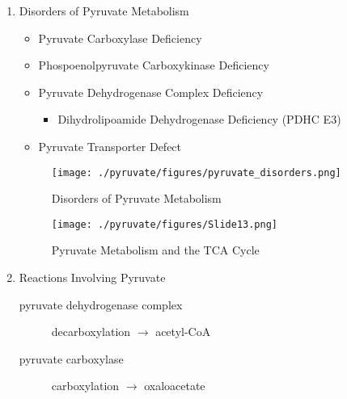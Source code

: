 \documentclass{scrartcl}
\begin{document}
\begin{center}
\setatomsep{1.8em}
\hspace{20}
\end{center}
\begin{enumerate}
\item Disorders of Pyruvate Metabolism
\label{sec:org49226a3}
\begin{itemize}
\item Pyruvate Carboxylase Deficiency
\item Phospoenolpyruvate Carboxykinase Deficiency
\item Pyruvate Dehydrogenase Complex Deficiency
\begin{itemize}
\item Dihydrolipoamide Dehydrogenase Deficiency (PDHC E3)
\end{itemize}
\item Pyruvate Transporter Defect
\end{itemize}

\begin{figure}[htbp]
\centering
\texttt{[image: ./pyruvate/figures/pyruvate\_disorders.png]}
\caption[TCA]{\label{fig:org500a801}
Disorders of Pyruvate Metabolism}
\end{figure}


\begin{figure}[htbp]
\centering
\texttt{[image: ./pyruvate/figures/Slide13.png]}
\caption[TCA]{\label{fig:org5dc46d8}
Pyruvate Metabolism and the TCA Cycle}
\end{figure}

\item Reactions Involving Pyruvate
\label{sec:org8d33627}

\begin{description}
\item[{pyruvate dehydrogenase complex}] decarboxylation \(\to\) acetyl-CoA
\end{description}


\begin{description}
\item[{pyruvate carboxylase}] carboxylation \(\to\) oxaloacetate
\end{description}


\end{enumerate}
\end{document}
